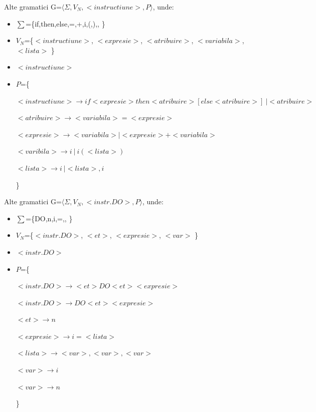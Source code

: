 \documentclass[pdf]{beamer}
\begin{document}
\begin{frame}{Alte gramatici}
G=$\langle \Sigma, V_N, <instructiune>, P \rangle$, unde:

\begin{itemize}
\item
$\sum$=\{if,then,else,=,+,i,(,),, \}
\item
$V_N$=\{$<instructiune>$, $<expresie>$, $<atribuire>$, $<variabila>$, $<lista>$ \}
\item
$<instructiune>$
\item
$P$=\{

$<instructiune> \rightarrow if <expresie> then <atribuire> [else < atribuire > ] \ | <atribuire>$

$<atribuire> \rightarrow <variabila> = <expresie > $

$<expresie> \rightarrow <variabila> | <expresie> + <variabila> $

$<varibila> \rightarrow i \ | \ i (<lista>)$

$<lista> \rightarrow i \ | <lista> , i $

\}
\end{itemize}

\end{frame}



\begin{frame}{Alte gramatici}
G=$\langle \Sigma, V_N, <instr. DO>, P \rangle$, unde:

\begin{itemize}
\item
$\sum$=\{DO,n,i,=,, \}
\item
$V_N$=\{$<instr. DO>$, $<et>$, $<expresie>$, $<var>$ \}
\item
$<instr. DO>$
\item
$P$=\{

$<instr. DO> \rightarrow <et> DO <et><expresie>$

$<instr. DO> \rightarrow DO <et> <expresie>$

$<et> \rightarrow n$

$<expresie> \rightarrow i = <lista>$

$<lista> \rightarrow <var>,<var>,<var>$

$<var> \rightarrow i$

$<var> \rightarrow n$

\}
\end{itemize}

\end{frame}
\end{document}
